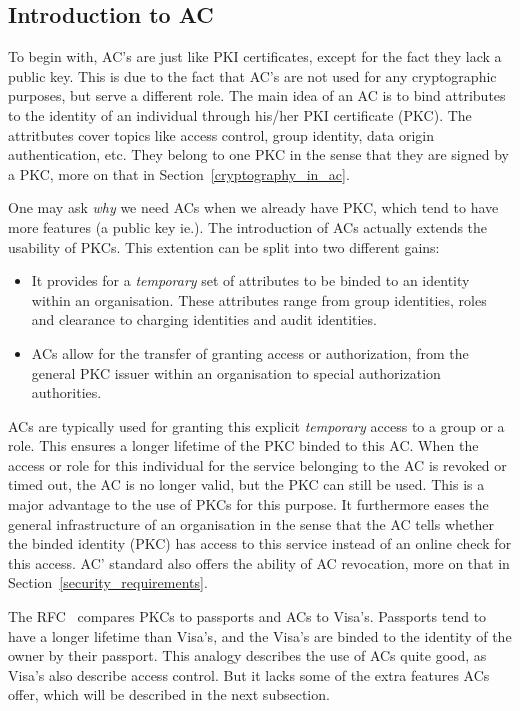 \documentclass[10pt,conference,a4paper]{IEEEtran}
\begin{document}
\subsection{Introduction to AC}
To begin with, AC's are just like PKI certificates, except for the fact they lack a public key. This is due to the fact that AC's are not used for any cryptographic purposes, but serve a different role. The main idea of an AC is to bind attributes to the identity of an individual through his/her PKI certificate (PKC). The attritbutes cover topics like access control, group identity, data origin authentication, etc. They belong to one PKC in the sense that they are signed by a PKC, more on that in Section~\ref{cryptography_in_ac}.

One may ask \textit{why} we need ACs when we already have PKC, which tend to have more features (a public key ie.). The introduction of ACs actually extends the usability of PKCs. This extention can be split into two different gains:
\begin{itemize}
	\item It provides for a \textit{temporary} set of attributes to be binded to an identity within an organisation. These attributes range from group identities, roles and clearance to charging identities and audit identities. 
	\item ACs allow for the transfer of granting access or authorization, from the general PKC issuer within an organisation to special authorization authorities.
\end{itemize}

ACs are typically used for granting this explicit \textit{temporary} access to a group or a role. This ensures a longer lifetime of the PKC binded to this AC. When the access or role for this individual for the service belonging to the AC is revoked or timed out, the AC is no longer valid, but the PKC can still be used. This is a major advantage to the use of PKCs for this purpose. It furthermore eases the general infrastructure of an organisation in the sense that the AC tells whether the binded identity (PKC) has access to this service instead of an online check for this access. AC' standard also offers the ability of AC revocation, more on that in Section~\ref{security_requirements}.

The RFC~\cite{rfc_ac} compares PKCs to passports and ACs to Visa's. Passports tend to have a longer lifetime than Visa's, and the Visa's are binded to the identity of the owner by their passport. This analogy describes the use of ACs quite good, as Visa's also describe access control. But it lacks some of the extra features ACs offer, which will be described in the next subsection.
\end{document}

